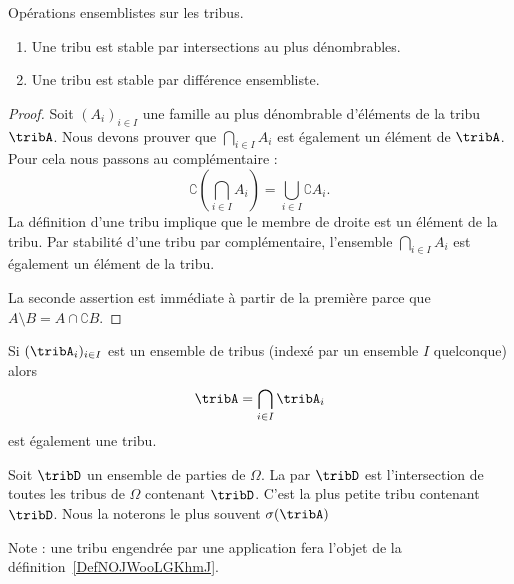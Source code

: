 \begin{lemma}   \label{LemBWNlKfA}
	Opérations ensemblistes sur les tribus.
	\begin{enumerate}
		\item       \label{ITEMooTDXNooFszBzi}
		      Une tribu est stable par intersections au plus dénombrables.
		\item       \label{ItemXQVLooFGBQNj}
		      Une tribu est stable par différence ensembliste.
	\end{enumerate}
\end{lemma}

\begin{proof}
	Soit \( (A_i)_{i\in I}\) une famille au plus dénombrable d'éléments de la tribu \( \tribA\). Nous devons prouver que \( \bigcap_{i\in I}A_i\) est également un élément de \( \tribA\). Pour cela nous passons au complémentaire :
	\begin{equation}
		\complement\left( \bigcap_{i\in I}A_i \right)=\bigcup_{i\in I}\complement A_i.
	\end{equation}
	La définition d'une tribu implique que le membre de droite est un élément de la tribu. Par stabilité d'une tribu par complémentaire, l'ensemble \( \bigcap_{i\in I}A_i\) est également un élément de la tribu.

	La seconde assertion est immédiate à partir de la première parce que \( A\setminus B=A\cap \complement B\).
\end{proof}

Si \( (\tribA_i)_{i\in I}\) est un ensemble de tribus (indexé par un ensemble \( I\) quelconque) alors
\begin{equation}
	\tribA=\bigcap_{i\in I}\tribA_i
\end{equation}
est également une tribu.

\begin{definition}
	Soit \( \tribD\) un ensemble de parties de \( \Omega\). La  par \( \tribD\) est l'intersection de toutes les tribus de \( \Omega\) contenant \( \tribD\). C'est la plus petite tribu contenant \( \tribD\). Nous la noterons le plus souvent \( \sigma(\tribA)\)
\end{definition}

Note : une tribu engendrée par une application fera l'objet de la définition~\ref{DefNOJWooLGKhmJ}.

